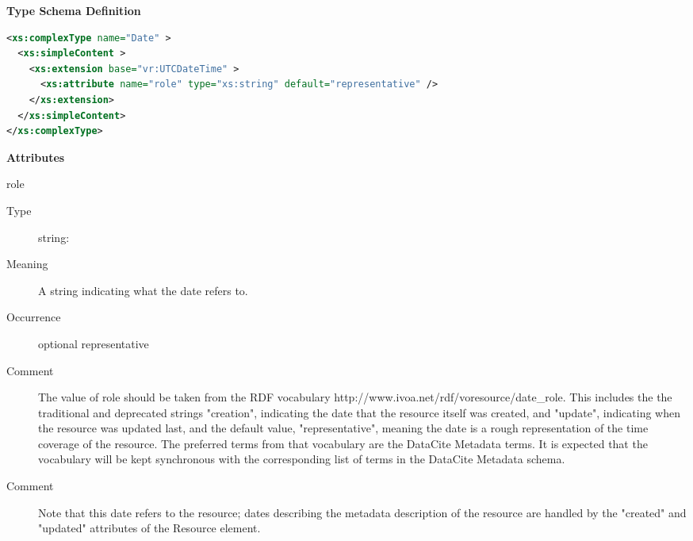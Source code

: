 \documentclass[11pt,a4paper]{ivoa}
\begin{document}
\begingroup
      	\renewcommand*\descriptionlabel[1]{%
      	\hbox to 5.5em{\emph{#1}\hfil}}\vspace{1ex}\noindent\textbf{ Type Schema Definition}

\begin{lstlisting}[language=XML,basicstyle=\footnotesize]
<xs:complexType name="Date" >
  <xs:simpleContent >
    <xs:extension base="vr:UTCDateTime" >
      <xs:attribute name="role" type="xs:string" default="representative" />
    </xs:extension>
  </xs:simpleContent>
</xs:complexType>
\end{lstlisting}

\vspace{0.5ex}\noindent\textbf{ Attributes}

\begingroup\small\begin{bigdescription}
\item[role]
\begin{description}
\item[Type] string: 
\item[Meaning] 
                 A string indicating what the date refers to.  
               
\item[Occurrence] optional
representative
\item[Comment] 
               	The value of role should be taken from the RDF vocabulary
               	http://www.ivoa.net/rdf/voresource/date\_role.
               	This includes the the traditional and deprecated strings
                {"}creation{"}, indicating the date that the resource 
                itself was created, and {"}update{"}, indicating when the
                resource was updated last, and the default value,
                {"}representative{"}, meaning the date is a rough 
                representation of the time coverage of the resource.
                The preferred terms from that vocabulary are the DataCite
                Metadata terms.   It is expected that the vocabulary will 
                be kept synchronous with the corresponding list of terms
                in the DataCite Metadata schema.
               
\item[Comment] 
                 Note that this date refers to the resource; dates describing
                 the metadata description of the resource are handled by
                 the {"}created{"} and {"}updated{"} attributes of the Resource 
                 element. 
               
\end{description}


\end{bigdescription}\endgroup
\end{document}
